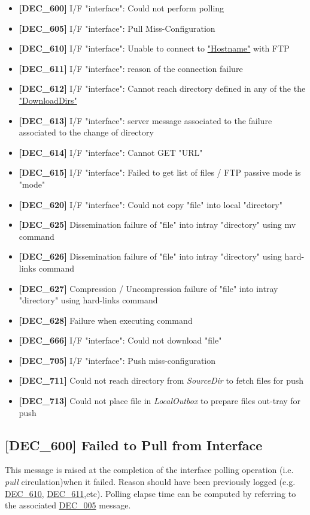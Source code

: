 \documentclass[dec_sum_main.tex]{subfiles}
\begin{document}
\begin{itemize}
	\item \textbf{[DEC\_600]} I/F "interface": Could not perform polling
	\item \textbf{[DEC\_605]} I/F "interface": Pull Miss-Configuration
	\item \textbf{[DEC\_610]} I/F "interface": Unable to connect to \hyperref[Config_Server]{"Hostname"} with FTP
	\item \textbf{[DEC\_611]} I/F "interface": reason of the connection failure
	\item \textbf{[DEC\_612]} I/F "interface": Cannot reach directory defined in any of the the \hyperref[DownloadDirs]{"DownloadDirs"}
	\item \textbf{[DEC\_613]} I/F "interface": server message associated to the failure associated to the change of directory
	\item \textbf{[DEC\_614]} I/F "interface": Cannot GET "URL"
	\item \textbf{[DEC\_615]} I/F "interface": Failed to get list of files / FTP passive mode is "mode"
	\item \textbf{[DEC\_620]} I/F "interface": Could not copy "file" into local
"directory"
	\item \textbf{[DEC\_625]} Dissemination failure of "file" into intray
"directory" using mv command
	\item \textbf{[DEC\_626]} Dissemination failure of "file" into intray
"directory" using hard-links command
	\item \textbf{[DEC\_627]} Compression / Uncompression failure of "file" into intray
"directory" using hard-links command
	\item \textbf{[DEC\_628]} Failure when executing command
	\item \textbf{[DEC\_666]} I/F "interface": Could not download "file"
	\item \textbf{[DEC\_705]} I/F "interface": Push miss-configuration
	\item \textbf{[DEC\_711]} Could not reach directory from \textit{SourceDir} to fetch files for push
	\item \textbf{[DEC\_713]} Could not place file in  \textit{LocalOutbox} to prepare files out-tray for push	
\end{itemize}

\label{DEC600}
\subsection{[DEC\_600] Failed to Pull from Interface}
This message is raised at the completion of the interface polling operation (i.e. \textit{pull} circulation)when it failed. Reason should have been previously logged (e.g. \hyperref[DEC610]{DEC\_610}, \hyperref[DEC611]{DEC\_611},etc). Polling elapse time can be computed by referring to the associated \hyperref[DEC005]{DEC\_005} message. 
\end{document}

